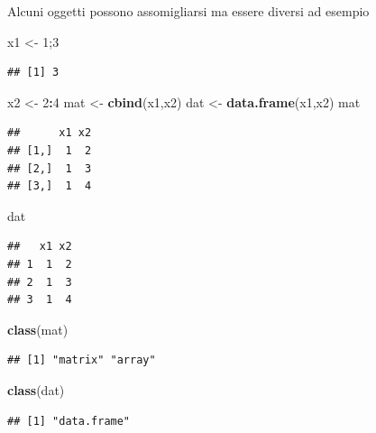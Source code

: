 \documentclass[
  11pt,
]{book}
\newenvironment{Shaded}{\begin{snugshade}}{\end{snugshade}}
\newcommand{\DecValTok}[1]{\textcolor[rgb]{0.00,0.00,0.81}{#1}}
\newcommand{\FunctionTok}[1]{\textcolor[rgb]{0.13,0.29,0.53}{\textbf{#1}}}
\newcommand{\NormalTok}[1]{#1}
\newcommand{\OtherTok}[1]{\textcolor[rgb]{0.56,0.35,0.01}{#1}}
\newcommand{\SpecialCharTok}[1]{\textcolor[rgb]{0.81,0.36,0.00}{\textbf{#1}}}
\theoremstyle{mytheoremstyle}
\theoremstyle{mydefstyle}
\newenvironment{att}
  {
\begin{tcolorbox}[enhanced,arc=0.1mm,boxrule=1pt,colback=white,colframe=ared,title=\bf\small \fontfamily{lmss}\selectfont \faExclamationTriangle \hspace{.5 cm} Attenzione,drop fuzzy shadow]
}{
\end{tcolorbox}
  }
\begin{document}
\begin{att}

Alcuni oggetti possono assomigliarsi ma essere diversi ad esempio

\begin{Shaded}
\begin{Highlighting}[]
\NormalTok{x1 }\OtherTok{\textless{}{-}} \DecValTok{1}\NormalTok{;}\DecValTok{3}
\end{Highlighting}
\end{Shaded}

\begin{verbatim}
## [1] 3
\end{verbatim}

\begin{Shaded}
\begin{Highlighting}[]
\NormalTok{x2 }\OtherTok{\textless{}{-}} \DecValTok{2}\SpecialCharTok{:}\DecValTok{4}
\NormalTok{mat }\OtherTok{\textless{}{-}} \FunctionTok{cbind}\NormalTok{(x1,x2)}
\NormalTok{dat }\OtherTok{\textless{}{-}} \FunctionTok{data.frame}\NormalTok{(x1,x2)}
\NormalTok{mat}
\end{Highlighting}
\end{Shaded}

\begin{verbatim}
##      x1 x2
## [1,]  1  2
## [2,]  1  3
## [3,]  1  4
\end{verbatim}

\begin{Shaded}
\begin{Highlighting}[]
\NormalTok{dat}
\end{Highlighting}
\end{Shaded}

\begin{verbatim}
##   x1 x2
## 1  1  2
## 2  1  3
## 3  1  4
\end{verbatim}

\begin{Shaded}
\begin{Highlighting}[]
\FunctionTok{class}\NormalTok{(mat)}
\end{Highlighting}
\end{Shaded}

\begin{verbatim}
## [1] "matrix" "array"
\end{verbatim}

\begin{Shaded}
\begin{Highlighting}[]
\FunctionTok{class}\NormalTok{(dat)}
\end{Highlighting}
\end{Shaded}

\begin{verbatim}
## [1] "data.frame"
\end{verbatim}

\end{att}
\end{document}
